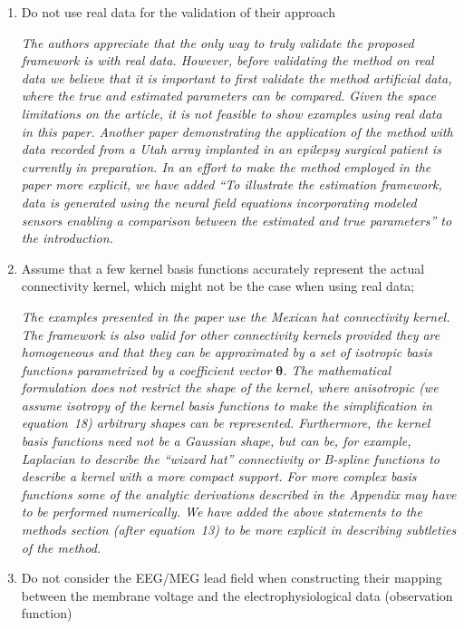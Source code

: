 \documentclass{article}
\begin{document}
    \begin{enumerate}
        \item Do not use real data for the validation of their approach

	\emph{The authors appreciate that the only way to truly validate the proposed framework is with real data. However, before validating the method on real data we believe that it is important to first validate the method artificial data, where the true and estimated parameters can be compared. Given the space limitations on the article, it is not feasible to show examples using real data in this paper. Another paper demonstrating the application of the method with data recorded from a Utah array implanted in an epilepsy surgical patient is currently in preparation. In an effort to make the method employed in the paper more explicit, we have added ``To illustrate the estimation framework, data is generated using the neural field equations incorporating modeled sensors enabling a comparison between the estimated and true parameters'' to the introduction.}
	
        \item Assume that a few kernel basis functions accurately represent the actual connectivity kernel, which might not be the case when using real data;

	\emph{The examples presented in the paper use the Mexican hat connectivity kernel. The framework is also valid for other connectivity kernels provided they are homogeneous and that they can be approximated by a set of isotropic basis functions parametrized by a coefficient vector $\mathbf{\theta}$. The mathematical formulation does not restrict the shape of the kernel, where anisotropic (we assume isotropy of the kernel basis functions to make the simplification in equation~18) arbitrary shapes can be represented. Furthermore, the kernel basis functions need not be a Gaussian shape, but can be, for example, Laplacian to describe the ``wizard hat'' connectivity or B-spline functions to describe a kernel with a more compact support. For more complex basis functions some of the analytic derivations described in the Appendix may have to be performed numerically. We have added the above statements to the methods section (after equation~13) to be more explicit in describing subtleties of the method.}

        \item Do not consider the EEG/MEG lead field when constructing their mapping between the membrane voltage and the electrophysiological data (observation function)


\end{enumerate}
\end{document}
